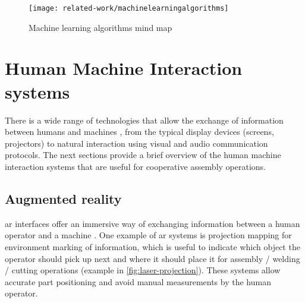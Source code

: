 \begin{figure}[H]
	\centering
	\texttt{[image: related-work/machinelearningalgorithms]}
	\caption[Machine learning algorithms mind map]{Machine learning algorithms mind map\protect\footnotemark}
	\label{fig:machinelearningalgorithms}
\end{figure}




\section{Human Machine Interaction systems}

There is a wide range of technologies that allow the exchange of information between humans and machines \cite{Goodrich2008}, from the typical display devices (screens, projectors) to natural interaction using visual and audio \cite{Yan2014} communication protocols. The next sections provide a brief overview of the human machine interaction systems that are useful for cooperative assembly operations.



\subsection{Augmented reality}

\gls{ar} interfaces offer an immersive way of exchanging information between a human operator and a machine \cite{Bimber2005}. One example of \gls{ar} systems is projection mapping \cite{Tan2013,Fujimoto2014} for environment marking of information, which is useful to indicate which object the operator should pick up next and where it should place it for assembly / welding / cutting operations (example in \cref{fig:laser-projection}). These systems allow accurate part positioning and avoid manual measurements by the human operator.

